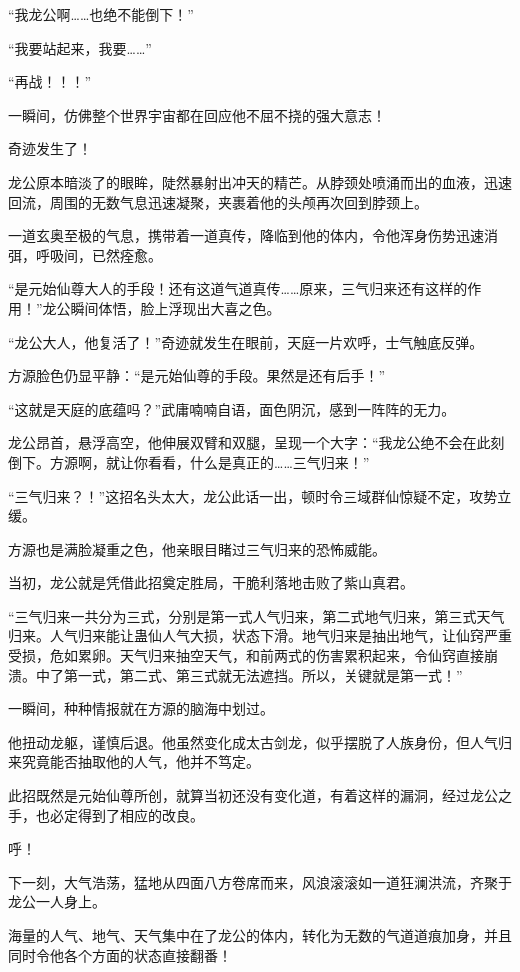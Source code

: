\begin{this_body}
“我龙公啊……也绝不能倒下！”

“我要站起来，我要……”

“再战！！！”

一瞬间，仿佛整个世界宇宙都在回应他不屈不挠的强大意志！

奇迹发生了！

龙公原本暗淡了的眼眸，陡然暴射出冲天的精芒。从脖颈处喷涌而出的血液，迅速回流，周围的无数气息迅速凝聚，夹裹着他的头颅再次回到脖颈上。

一道玄奥至极的气息，携带着一道真传，降临到他的体内，令他浑身伤势迅速消弭，呼吸间，已然痊愈。

“是元始仙尊大人的手段！还有这道气道真传……原来，三气归来还有这样的作用！”龙公瞬间体悟，脸上浮现出大喜之色。

“龙公大人，他复活了！”奇迹就发生在眼前，天庭一片欢呼，士气触底反弹。

方源脸色仍显平静：“是元始仙尊的手段。果然是还有后手！”

“这就是天庭的底蕴吗？”武庸喃喃自语，面色阴沉，感到一阵阵的无力。

龙公昂首，悬浮高空，他伸展双臂和双腿，呈现一个大字：“我龙公绝不会在此刻倒下。方源啊，就让你看看，什么是真正的……三气归来！”

“三气归来？！”这招名头太大，龙公此话一出，顿时令三域群仙惊疑不定，攻势立缓。

方源也是满脸凝重之色，他亲眼目睹过三气归来的恐怖威能。

当初，龙公就是凭借此招奠定胜局，干脆利落地击败了紫山真君。

“三气归来一共分为三式，分别是第一式人气归来，第二式地气归来，第三式天气归来。人气归来能让蛊仙人气大损，状态下滑。地气归来是抽出地气，让仙窍严重受损，危如累卵。天气归来抽空天气，和前两式的伤害累积起来，令仙窍直接崩溃。中了第一式，第二式、第三式就无法遮挡。所以，关键就是第一式！”

一瞬间，种种情报就在方源的脑海中划过。

他扭动龙躯，谨慎后退。他虽然变化成太古剑龙，似乎摆脱了人族身份，但人气归来究竟能否抽取他的人气，他并不笃定。

此招既然是元始仙尊所创，就算当初还没有变化道，有着这样的漏洞，经过龙公之手，也必定得到了相应的改良。

呼！

下一刻，大气浩荡，猛地从四面八方卷席而来，风浪滚滚如一道狂澜洪流，齐聚于龙公一人身上。

海量的人气、地气、天气集中在了龙公的体内，转化为无数的气道道痕加身，并且同时令他各个方面的状态直接翻番！


\end{this_body}
